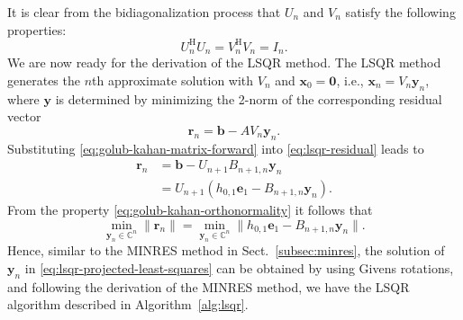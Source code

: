 {It is clear from the bidiagonalization process that $U_n$ and $V_n$ satisfy the following properties:}
\begin{equation}\label{eq:golub-kahan-orthonormality}U_n^{\mathrm H}U_n=V_n^{\mathrm H}V_n=I_n.\end{equation}
{We are now ready for the derivation of the LSQR method. The LSQR method generates the $n$th approximate solution with $V_n$ and $\bm x_0=\bm0$, i.e., $\bm x_n=V_n\bm y_n$, where $\bm y$ is determined by minimizing the 2-norm of the corresponding residual vector}
\begin{equation}\label{eq:lsqr-residual}\bm r_n=\bm b-AV_n\bm y_n.\end{equation}
{Substituting \eqref{eq:golub-kahan-matrix-forward} into \eqref{eq:lsqr-residual} leads to}
\[\begin{aligned}\bm r_n&=\bm b-U_{n+1}B_{n+1,n}\bm y_n\\&=U_{n+1}(h_{0,1}\bm e_1-B_{n+1,n}\bm y_n).\end{aligned}\]
{From the property \eqref{eq:golub-kahan-orthonormality} it follows that}
\begin{equation}\label{eq:lsqr-projected-least-squares}\min_{\bm y_n\in\mathbb C^n}\|\bm r_n\|=\min_{\bm y_n\in\mathbb C^n}\|h_{0,1}\bm e_1-B_{n+1,n}\bm y_n\|.\end{equation}
{Hence, similar to the MINRES method in Sect.\ \ref{subsec:minres}, the solution of $\bm y_n$ in \eqref{eq:lsqr-projected-least-squares} can be obtained by using Givens rotations, and following the derivation of the MINRES method, we have the LSQR algorithm described in Algorithm\ \ref{alg:lsqr}.}
